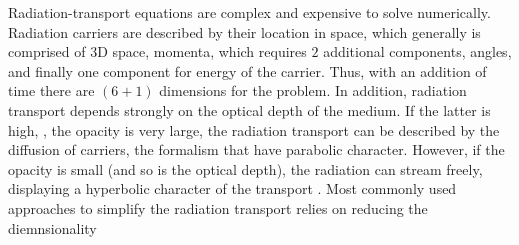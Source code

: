 %
Radiation-transport equations are complex and expensive to solve numerically. 
Radiation carriers are described by their location in space, which generally is comprised of $3$D space, momenta, 
which requires $2$ additional components, angles, and finally one component for energy of the carrier. 
Thus, with an addition of time there are $(6+1)$ dimensions for the problem. 
In addition, radiation transport depends strongly on the optical depth of the medium. 
If the latter is high, \ie, the opacity is very large, the radiation transport 
can be described by the diffusion of carriers, the formalism that have parabolic character. 
However, if the opacity is small (and so is the optical depth), the radiation can stream freely, 
displaying a hyperbolic character of the transport \citep{Mihalas:1984}. 
%
Most commonly used approaches to simplify the radiation transport relies on reducing the diemnsionality
